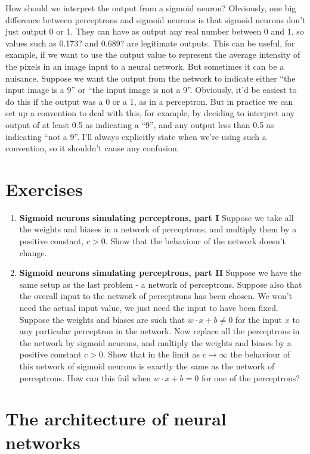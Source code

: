 How should we interpret the output from a sigmoid neuron? Obviously, one big difference between perceptrons and sigmoid neurons is that sigmoid neurons don't just output 0 or 1. They can have as output any real number between 0 and 1, so values such as 0.173? and 0.689? are legitimate outputs. This can be useful, for example, if we want to use the output value to represent the average intensity of the pixels in an image input to a neural network. But sometimes it can be a nuisance. Suppose we want the output from the network to indicate either ``the input image is a 9'' or ``the input image is not a 9''. Obviously, it'd be easiest to do this if the output was a 0 or a 1, as in a perceptron. But in practice we can set up a convention to deal with this, for example, by deciding to interpret any output of at least 0.5 as indicating a ``9'', and any output less than 0.5 as indicating ``not a 9''. I'll always explicitly state when we're using such a convention, so it shouldn't cause any confusion.

\section{Exercises}
\begin{enumerate}
\item \textbf{Sigmoid neurons simulating perceptrons, part I} Suppose we take all the weights and biases in a network of perceptrons, and multiply them by a positive constant, $c>0$.
Show that the behaviour of the network doesn't change.

\item \textbf{Sigmoid neurons simulating perceptrons, part II} Suppose we have the same setup as the last problem - a network of perceptrons. Suppose also that the overall input to the network of perceptrons has been chosen. We won't need the actual input value, we just need the input to have been fixed. Suppose the weights and biases are such that $w \cdot x+b \neq 0$ for the input $x$ to any particular perceptron in the network. Now replace all the perceptrons in the network by sigmoid neurons, and multiply the weights and biases by a positive constant $c>0$. Show that in the limit as $c \rightarrow \infty$ the behaviour of this network of sigmoid neurons is exactly the same as the network of perceptrons. How can this fail when $w \cdot x+b=0$ for one of the perceptrons?
\end{enumerate}
 

\section{The architecture of neural networks}

